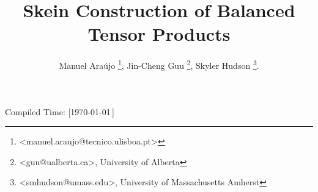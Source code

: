 \title{\vspace{-30pt} Skein Construction of Balanced Tensor Products}
\author{
  Manuel Ara\'{u}jo \thanks{<manuel.araujo@tecnico.ulisboa.pt>},
  Jin-Cheng Guu \thanks{<guu@ualberta.ca>, University of Alberta},
  Skyler Hudson \thanks{<smhudson@umass.edu>, University of Massachusetts Amherst}.
}
\date{}

\newcommand{\III}[9]{%
  {}^{#1}_{#2} I^{#3}_{#4}
  \left(
    \begin{matrix}
      #5 \\ {}\\ #6
    \end{matrix}
    \,\middle|\,
    \begin{matrix}
      #7 \\ #8 \\ #9
    \end{matrix}
  \right)
}
\newcommand{\II}[7]{%
  {}^{#1}_{#2} I^{#3}_{#4}
  \left( #5, #6
    \,\middle|\,
    #7
  \right)
}



\maketitle

\vspace{-25pt}


\begin{flushright}
  \tiny{Compiled Time: [\today\,\DTMcurrenttime]}
\end{flushright}

\vspace{-25pt}
\tableofcontents

